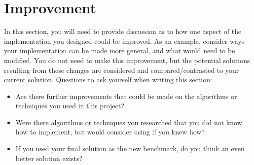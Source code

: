 \documentclass[twoside,openright,titlepage,numbers=noenddot,headinclude,%
               footinclude=true,cleardoublepage=empty,abstractoff,BCOR=5mm,%
               paper=a4,fontsize=11pt,ngerman,american]{scrreprt}
\numberwithin{theorem}{chapter}
\numberwithin{definition}{chapter}
\numberwithin{algorithm}{chapter}
\numberwithin{figure}{chapter}
\numberwithin{table}{chapter}
\numberwithin{equation}{chapter}
\begin{document}

\section*{Improvement}
In this section, you will need to provide discussion as to how one aspect of the implementation you designed could be improved. As an example, consider ways your implementation can be made more general, and what would need to be modified. You do not need to make this improvement, but the potential solutions resulting from these changes are considered and compared/contrasted to your current solution. Questions to ask yourself when writing this section:
\begin{itemize}%
\item Are there further improvements that could be made on the algorithms or techniques you used in this project?
\item Were there algorithms or techniques you researched that you did not know how to implement, but would consider using if you knew how?
\item If you used your final solution as the new benchmark, do you think an even better solution exists?
\end{itemize}
\end{document}
